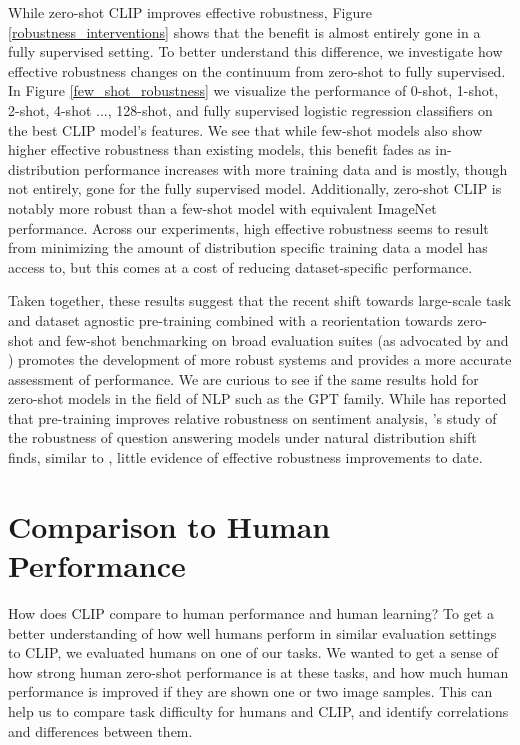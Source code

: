 While zero-shot CLIP improves effective robustness, Figure \ref{robustness_interventions} shows that the benefit is almost entirely gone in a fully supervised setting. To better understand this difference, we investigate how effective robustness changes on the continuum from zero-shot to fully supervised. In Figure \ref{few_shot_robustness} we visualize the performance of 0-shot, 1-shot, 2-shot, 4-shot ..., 128-shot, and fully supervised logistic regression classifiers on the best CLIP model's features. We see that while few-shot models also show higher effective robustness than existing models, this benefit fades as in-distribution performance increases with more training data and is mostly, though not entirely, gone for the fully supervised model. Additionally, zero-shot CLIP is notably more robust than a few-shot model with equivalent ImageNet performance. Across our experiments, high effective robustness seems to result from minimizing the amount of distribution specific training data a model has access to, but this comes at a cost of reducing dataset-specific performance. 

Taken together, these results suggest that the recent shift towards large-scale task and dataset agnostic pre-training combined with a reorientation towards zero-shot and few-shot benchmarking on broad evaluation suites (as advocated by \citet{yogatama2019learning} and \citet{linzen2020can}) promotes the development of more robust systems and provides a more accurate assessment of performance. We are curious to see if the same results hold for zero-shot models in the field of NLP such as the GPT family. While \citet{hendrycks2020pretrained} has reported that pre-training improves relative robustness on sentiment analysis, \citet{miller2020effect}'s study of the robustness of question answering models under natural distribution shift finds, similar to \citet{taori2020measuring}, little evidence of effective robustness improvements to date.

\section{Comparison to Human Performance}
\label{section:human_comparison}

How does CLIP compare to human performance and human learning? To get a better understanding of how well humans perform in similar evaluation settings to CLIP, we evaluated humans on one of our tasks. We wanted to get a sense of how strong human zero-shot performance is at these tasks, and how much human performance is improved if they are shown one or two image samples. This can help us to compare task difficulty for humans and CLIP, and identify correlations and differences between them.

